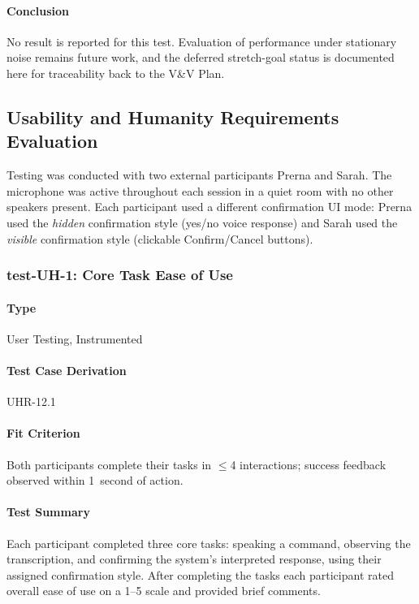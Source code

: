 \documentclass[12pt, titlepage]{article}
\begin{document}
\paragraph{Conclusion}
No result is reported for this test. Evaluation of performance under stationary noise remains future work, and the deferred stretch-goal status is documented here for traceability back to the V\&V Plan.


\subsection{Usability and Humanity Requirements Evaluation}

Testing was conducted with two external participants Prerna and Sarah. The microphone was active throughout each
session in a quiet room with no other speakers present. Each participant used a different confirmation UI mode: Prerna used the \emph{hidden} confirmation
style (yes/no voice response) and Sarah used the \emph{visible} confirmation style (clickable Confirm/Cancel buttons).

\subsubsection{test-UH-1: Core Task Ease of Use}

\paragraph{Type} User Testing, Instrumented

\paragraph{Test Case Derivation} UHR-12.1

\paragraph{Fit Criterion}
Both participants complete their tasks in $\leq$4 interactions;
success feedback observed within 1~second of action.

\paragraph{Test Summary}
Each participant completed three core tasks: speaking a command, observing
the transcription, and confirming the system's interpreted response, using
their assigned confirmation style. After completing the tasks each participant
rated overall ease of use on a 1--5 scale and provided brief comments.
\end{document}
